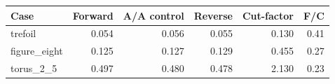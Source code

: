 \begin{center}\begin{tabular}{lrrrrr}\toprule
Case & Forward & A/A control & Reverse & Cut-factor & F/C\\\midrule
trefoil & 0.054 & 0.056 & 0.055 & 0.130 & 0.41\\
figure\_eight & 0.125 & 0.127 & 0.129 & 0.455 & 0.27\\
torus\_2\_5 & 0.497 & 0.480 & 0.478 & 2.130 & 0.23\\
\bottomrule\end{tabular}\end{center}

